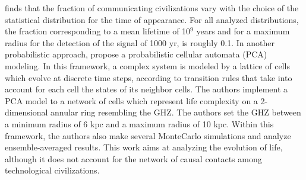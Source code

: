%
\citet{balbi_impact_2018} finds that the fraction of communicating
civilizations vary with the choice of the statistical distribution for
the time of appearance. For all analyzed distributions, the fraction
corresponding to a mean lifetime of 10$^9$ years and for a maximum
radius for the detection of the signal of 1000 yr, is roughly 0.1.
%
In another probabilistic approach,
\citet{vukotic_astrobiological_2012} propose a
probabilistic cellular automata (PCA) modeling. In this
framework, a complex system is modeled by a lattice of cells which
evolve at discrete time steps, according to transition rules that take
into account for each cell the states of its neighbor cells.
%
The authors implement a PCA model to a network of cells which
represent life complexity on a 2-dimensional annular ring resembling
the GHZ. The authors set the GHZ between a minimum radius of 6 kpc and
a maximum radius of 10 kpc. Within this framework, the authors also
make several MonteCarlo simulations and analyze ensemble-averaged
results.
%
This work aims at analyzing the evolution of life, although it does
not account for the network of causal contacts among technological
civilizations.














